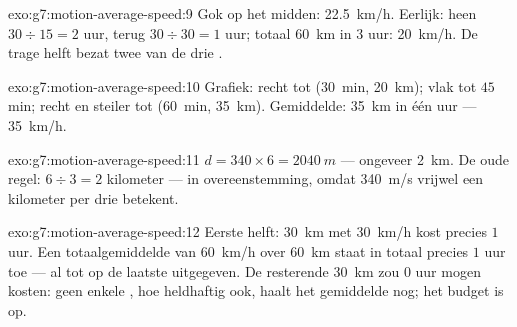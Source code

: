 \begin{solution}{exo:g7:motion-average-speed:9}
Gok op het midden: \qty{22.5}{km/h}. Eerlijk: heen $30 \div 15 = 2$
uur, terug $30 \div 30 = 1$ uur; totaal \qty{60}{km} in $3$
uur: \qty{20}{km/h}. De trage helft bezat twee van de drie
.
\end{solution}

\begin{solution}{exo:g7:motion-average-speed:10}
Grafiek: recht tot (\qty{30}{min}, \qty{20}{km}); vlak tot $45$ min;
recht en steiler tot (\qty{60}{min}, \qty{35}{km}). Gemiddelde:
\qty{35}{km} in één uur --- \qty{35}{km/h}.
\end{solution}

\begin{solution}{exo:g7:motion-average-speed:11}
$d = 340 \times 6 = \qty{2040}{m}$ --- ongeveer \qty{2}{km}. De oude
regel: $6 \div 3 = 2$ kilometer --- in overeenstemming, omdat
\qty{340}{m/s} vrijwel een kilometer per drie  betekent.
\end{solution}

\begin{solution}{exo:g7:motion-average-speed:12}
Eerste helft: \qty{30}{km} met \qty{30}{km/h} kost precies $1$ uur. Een
totaalgemiddelde van \qty{60}{km/h} over \qty{60}{km} staat in totaal
precies $1$ uur toe --- al tot op de laatste  uitgegeven. De
resterende \qty{30}{km} zou $0$ uur mogen kosten: geen enkele
, hoe heldhaftig ook, haalt het gemiddelde nog; het budget
is op.
\end{solution}

